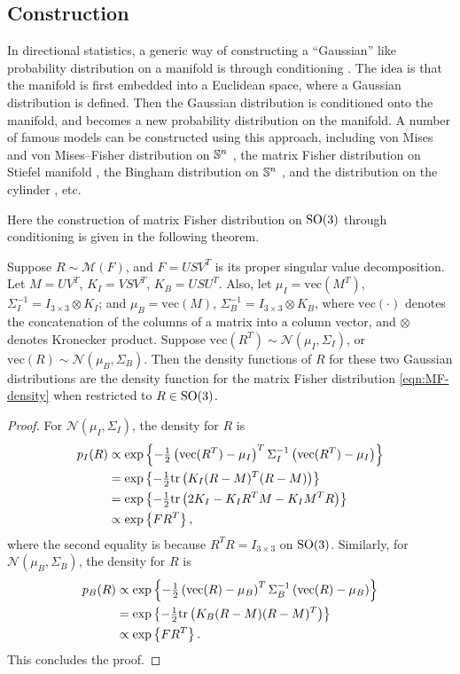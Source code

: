 \subsection{Construction}

In directional statistics, a generic way of constructing a ``Gaussian'' like probability distribution on a manifold is through conditioning \cite{pewsey2021recent}.
The idea is that the manifold is first embedded into a Euclidean space, where a Gaussian distribution is defined.
Then the Gaussian distribution is conditioned onto the manifold, and becomes a new probability distribution on the manifold.
A number of famous models can be constructed using this approach, including von Mises and von Mises--Fisher distribution on $\mathbb{S}^n$ \cite{mardia2009directional}, the matrix Fisher distribution on Stiefel manifold \cite{downs1972orientation}, the Bingham distribution on $\mathbb{S}^n$ \cite{bingham1974antipodally}, and the distribution on the cylinder \cite{mardia1978model}, etc.

Here the construction of matrix Fisher distribution on $\mathrm{SO}(3)$ through conditioning is given in the following theorem.
\begin{theorem} \label{thm:MF-construction}
	Suppose $R\sim\mathcal{M}(F)$, and $F=USV^T$ is its proper singular value decomposition.
	Let $M = UV^T$, $K_I = VSV^T$, $K_B = USU^T$.
	Also, let $\mu_I = \mathrm{vec}(M^T)$, $\Sigma_I^{-1} = I_{3\times 3}\otimes K_I$; and $\mu_B = \mathrm{vec}(M)$, $\Sigma_B^{-1} = I_{3\times 3}\otimes K_B$, where $\mathrm{vec}(\cdot)$ denotes the concatenation of the columns of a matrix into a column vector, and $\otimes$ denotes Kronecker product.
	Suppose $\mathrm{vec}(R^T) \sim \mathcal{N}(\mu_I,\Sigma_I)$, or $\mathrm{vec}(R) \sim \mathcal{N}(\mu_B,\Sigma_B)$.
	Then the density functions of $R$ for these two Gaussian distributions are the density function for the matrix Fisher distribution \eqref{eqn:MF-density} when restricted to $R\in\mathrm{SO}(3)$.
\end{theorem}
\begin{proof}
	For $\mathcal{N}(\mu_I,\Sigma_I)$, the density for $R$ is
	\begin{align*}
		p_I(R) &\propto \exp\left\{ -\tfrac{1}{2} \left( \mathrm{vec}(R^T)-\mu_I \right)^T \Sigma_I^{-1} \left( \mathrm{vec}(R^T)-\mu_I \right) \right\} \\
		&= \exp\left\{ -\tfrac{1}{2} \mathrm{tr}\left( K_I(R-M)^T(R-M) \right) \right\} \\
		&= \exp\left\{ -\tfrac{1}{2} \mathrm{tr}\left( 2K_I - K_IR^TM - K_IM^TR \right) \right\} \\
		&\propto \exp\left\{ FR^T \right\},
	\end{align*}
	where the second equality is because $R^TR = I_{3\times 3}$ on $\mathrm{SO}(3)$.
	Similarly, for $\mathcal{N}(\mu_B,\Sigma_B)$, the density for $R$ is
	\begin{align*}
		p_B(R) &\propto \exp\left\{ -\tfrac{1}{2} \left( \mathrm{vec}(R)-\mu_B \right)^T \Sigma_B^{-1} \left( \mathrm{vec}(R)-\mu_B \right) \right\} \\
		&= \exp\left\{ -\tfrac{1}{2} \mathrm{tr}\left( K_B(R-M)(R-M)^T \right) \right\} \\
		&\propto \exp\left\{ FR^T \right\}.
	\end{align*}
	This concludes the proof.
\end{proof}

